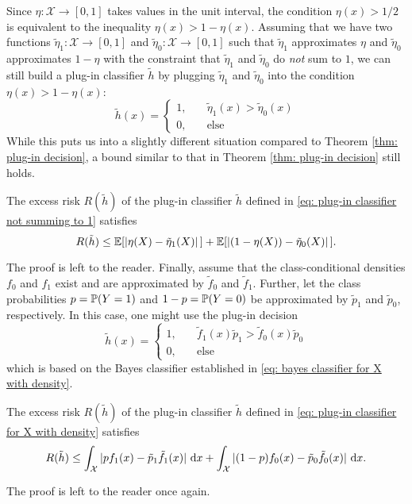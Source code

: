 Since $\eta \colon \mathcal{X} \to [0, 1]$ takes values in the unit interval, the condition $\eta(x) > 1/2$ is equivalent to the inequality $\eta(x) > 1 - \eta(x)$. Assuming that we have two functions $\tilde{\eta}_1 \colon \mathcal{X} \to [0, 1]$ and $\tilde{\eta}_0 \colon \mathcal{X} \to [0, 1]$ such that $\tilde{\eta}_1$ approximates $\eta$ and $\tilde{\eta}_0$ approximates $1 - \eta$ with the constraint that $\tilde{\eta}_1$ and $\tilde{\eta}_0$ do \emph{not} sum to $1$, we can still build a plug-in classifier $\tilde{h}$ by plugging $\tilde{\eta}_1$ and $\tilde{\eta}_0$ into the condition $\eta(x) > 1 - \eta(x)$:
\begin{equation}
\label{eq: plug-in classifier not summing to 1}
    \tilde{h}(x) = \begin{cases}
        1, \quad & \tilde{\eta}_1(x) > \tilde{\eta}_0(x) \\
        0, \quad & \text{else}
    \end{cases}
\end{equation}
While this puts us into a slightly different situation compared to Theorem \ref{thm: plug-in decision}, a bound similar to that in Theorem \ref{thm: plug-in decision} still holds.

\begin{theorem}
The excess risk $R(\tilde{h})$ of the plug-in classifier $\tilde{h}$ defined in \eqref{eq: plug-in classifier not summing to 1} satisfies
\[
    R(\tilde{h}) \leq \Exp[\abs*{\eta(X) - \tilde{\eta}_1(X)}] + \Exp[\abs*{(1 - \eta(X)) - \tilde{\eta}_0(X)}].
\]
\end{theorem}

The proof is left to the reader. Finally, assume that the class-conditional densities $f_0$ and $f_1$ exist and are approximated by $\tilde{f}_0$ and $\tilde{f}_1$. Further, let the class probabilities $p = \P(Y = 1)$ and $1 - p = \P(Y = 0)$ be approximated by $\tilde{p}_1$ and $\tilde{p}_0$, respectively. In this case, one might use the plug-in decision
\begin{equation}
\label{eq: plug-in classifier for X with density}
    \tilde{h}(x) = \begin{cases}
        1, \quad & \tilde{f}_1(x) \tilde{p}_1 > \tilde{f}_0(x) \tilde{p}_0 \\
        0, \quad & \text{else}
    \end{cases}
\end{equation}
which is based on the Bayes classifier established in \eqref{eq: bayes classifier for X with density}.

\begin{proposition}
The excess risk $R(\tilde{h})$ of the plug-in classifier $\tilde{h}$ defined in \eqref{eq: plug-in classifier for X with density} satisfies
\[
    R(\tilde{h}) \leq \int_{\mathcal{X}} \abs*{pf_1(x) - \tilde{p}_1\tilde{f}_1(x) } \dx + \int_{\mathcal{X}} \abs*{(1 - p)f_0(x) - \tilde{p}_0\tilde{f}_0(x)} \dx.
\]
\end{proposition}

The proof is left to the reader once again.
